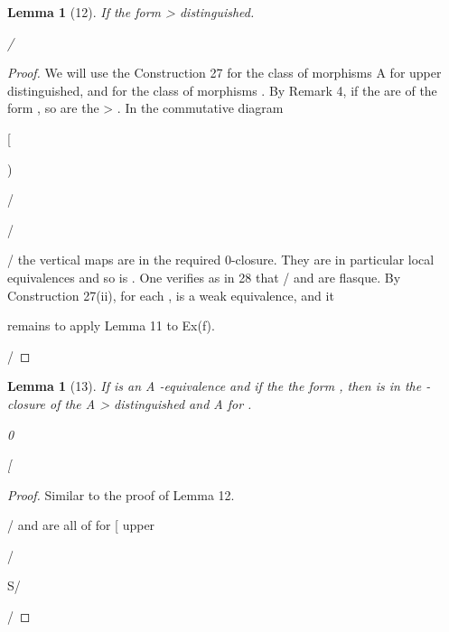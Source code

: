 \documentclass[11pt,a4paper]{article}
\theoremstyle{plain}
\newtheorem{lemma}[theorem]{Lemma}
\theoremstyle{definition}
\begin{document}
\begin{lemma}[12]
If
the form
>
distinguished.





 

/ 

\end{lemma}

\begin{proof} We will use the Construction 27 for the class of morphisms A
for
upper distinguished, and for
the class of morphisms 
.
By Remark 4, if the  are of the form
, so are the
>
 . In the
commutative diagram



[

)


/

/

 







/    
the vertical maps are in the required 0-closure. They are in particular local equivalences and so is  . One verifies as in 28 that /  and   are flasque.
By Construction 27(ii), for each  ,   is a weak equivalence, and it


remains to apply Lemma 11 to Ex(f).

 /






\end{proof}

\begin{lemma}[13]
If
is an A -equivalence and if the
the form
, then is in the  -closure of the A
>
distinguished and
 A
for 
.





0

 [

\end{lemma}

\begin{proof} Similar to the proof of Lemma 12.

 

/ and  are all of
 for [ upper




/

S/ 

/

\end{proof}
\end{document}
